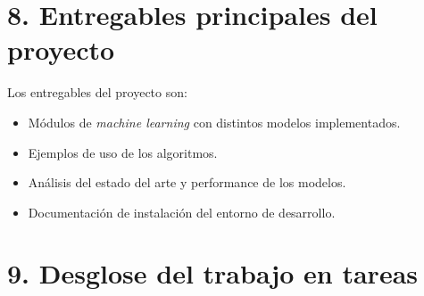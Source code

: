 \documentclass[
11pt, %
codirector, %
]{charter}
\begin{document}
\section{8. Entregables principales del proyecto}
\label{sec:entregables}

Los entregables del proyecto son:
\begin{itemize}
	\item Módulos de \textit{machine learning} con distintos modelos implementados.
	\item Ejemplos de uso de los algoritmos.
	\item Análisis del estado del arte y performance de los modelos.
	\item Documentación de instalación del entorno de desarrollo.
\end{itemize}

\section{9. Desglose del trabajo en tareas}
\label{sec:wbs}
\end{document}
